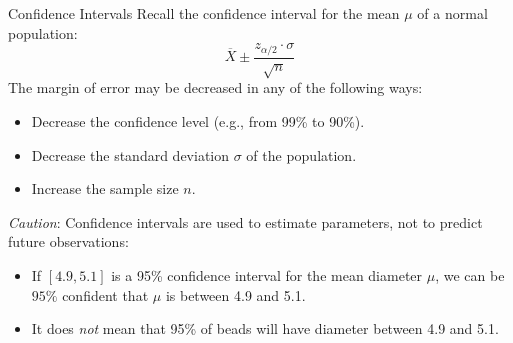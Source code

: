 \documentclass{beamer}
\begin{document}

\begin{frame}{Confidence Intervals}
Recall the confidence interval for the mean $\mu$ of a normal population:
$$\overline{X}\pm \frac{z_{\alpha/2} \cdot \sigma}{\sqrt n}$$
\pause The margin of error may be decreased in any of the following ways:

\begin{itemize}
\pause\item Decrease the confidence level (e.g., from 99\% to 90\%).
\pause\item Decrease the standard deviation $\sigma$ of the population.
\pause\item Increase the sample size $n$.
\end{itemize}
\pause\textit{Caution}: Confidence intervals are used to estimate parameters, not to predict future observations:
\begin{itemize}
\pause\item If $[4.9,5.1]$ is a 95\% confidence interval for the mean diameter $\mu$, we can be $95\%$ confident that $\mu$ is between 4.9 and 5.1. 
\pause\item It does \textit{not} mean that 95\% of beads will have diameter between 4.9 and 5.1.
\end{itemize}
\end{frame}
\end{document}
